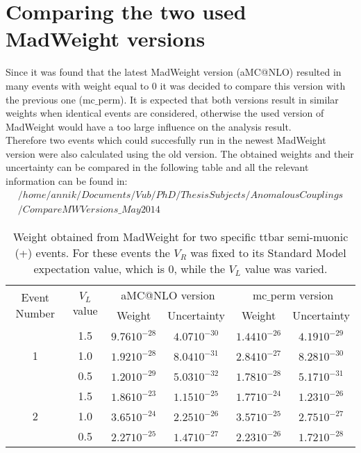 \documentclass[a4paper,12pt]{report}
\begin{document}
\section{Comparing the two used MadWeight versions}
Since it was found that the latest MadWeight version (aMC@NLO) resulted in many events with weight equal to $0$ it was decided to compare this version with the previous one (mc$\_$perm). It is expected that both versions result in similar weights when identical events are considered, otherwise the used version of MadWeight would have a too large influence on the analysis result.\\
Therefore two events which could succesfully run in the newest MadWeight version were also calculated using the old version. The obtained weights and their uncertainty can be compared in the following table and all the relevant information can be found in:
\begin{eqnarray*}
 /home/annik/Documents/Vub/PhD/ThesisSubjects/AnomalousCouplings\\ /CompareMWVersions\_May2014
\end{eqnarray*}

\begin{table}[h!]
 \centering
 \begin{tabular}{|c|c|c|c|c|c|}
  \hline
  \multirow{2}{*}{Event Number} &  \multirow{2}{*}{$V_L$ value}	& \multicolumn{2}{|c|}{aMC@NLO version}		& \multicolumn{2}{|c|}{mc$\_$perm version}  	\\
				&  				& Weight		& Uncertainty		& Weight 		& Uncertainty  		\\
  \hline
  \multirow{3}{*}{1} 		& 1.5 				& $9.76 10^{-28}$	& $4.07 10^{-30}$	& $1.44 10^{-26}$	& $4.19 10^{-29}$	\\
				& 1.0				& $1.92 10^{-28}$	& $8.04 10^{-31}$	& $2.84 10^{-27}$	& $8.28 10^{-30}$	\\
				& 0.5				& $1.20 10^{-29}$	& $5.03 10^{-32}$	& $1.78 10^{-28}$	& $5.17 10^{-31}$	\\
  \hline 
  \multirow{3}{*}{2}	 	& 1.5 				& $1.86 10^{-23}$	& $1.15 10^{-25}$	& $1.77 10^{-24}$	& $1.23 10^{-26}$	\\
				& 1.0				& $3.65 10^{-24}$	& $2.25 10^{-26}$	& $3.57 10^{-25}$	& $2.75 10^{-27}$	\\
				& 0.5				& $2.27 10^{-25}$	& $1.47 10^{-27}$	& $2.23 10^{-26}$	& $1.72 10^{-28}$	\\
  \hline 
 \end{tabular} 
 \caption{Weight obtained from MadWeight for two specific ttbar semi-muonic (+) events. For these events the $V_R$ was fixed to its Standard Model expectation value, which is $0$, while the $V_L$ value was varied.} 
\end{table}
\end{document}
